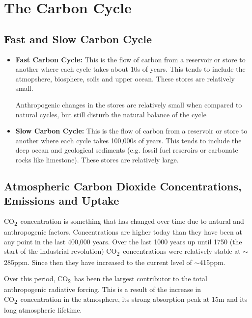 \section{The Carbon Cycle}
\label{sec:carbon-cycle}

\newcommand{\COtwo}{CO\textsubscript{2}\ }  %

\subsection{Fast and Slow Carbon Cycle}
\label{sec:fast-slow-carbon}

\begin{itemize}
    \item \textbf{Fast Carbon Cycle:} This is the flow of carbon from a reservoir or store to another where each cycle 
    takes about 10s of years. This tends to include the atmopshere, biosphere, soils and upper ocean. These stores are
    relatively small. 

    Anthropogenic changes in the stores are relatively small when compared to natural cycles, but still disturb the 
    natural balance of the cycle

    \item \textbf{Slow Carbon Cycle:} This is the flow of carbon from a reservoir or store to another where each cycle
    takes 100,000s of years. This tends to include the deep ocean and geological sediments (e.g. fossil fuel reseroirs
    or carbonate rocks like limestone). These stores are relatively large.
\end{itemize}

\subsection{Atmospheric Carbon Dioxide Concentrations, Emissions and Uptake}
\COtwo concentration is something that has changed over time due to natural and anthropogenic factors. Concentrations
are higher today than they have been at any point in the last 400,000 years. Over the last 1000 years up until 1750 (the
start of the industrial revolution) \COtwo concentrations were relatively stable at $\sim$285ppm. Since then they have
increased to the current level of $\sim$415ppm. 

Over this period, \COtwo has been the largest contributor to the total anthropogenic radiative forcing. This is a result
of the increase in \COtwo concentration in the atmosphere, its strong absorption peak at 15\textmu m and its long 
atmospheric lifetime.\\


